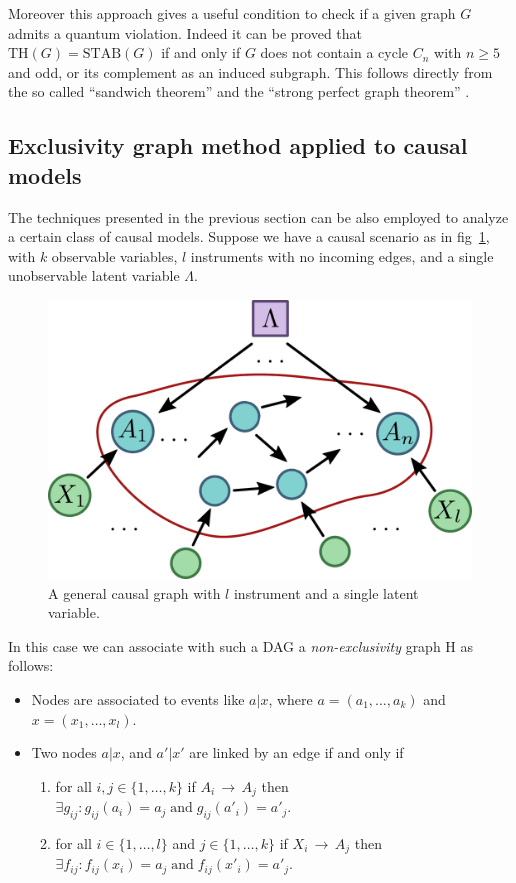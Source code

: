 \documentclass[
    nofootinbin,
    floatfix,
    amsfonts,
    twocolumn, 
    aps, 
    prl]{revtex4-1}
\newcommand{\et}{\;\mathrm{and}\;}
\newcommand{\STAB}{\mathrm{STAB}}
\renewcommand{\TH}{\mathrm{TH}}
\begin{document}
Moreover this approach gives a useful condition to check if a given graph $G$
admits a quantum violation.
Indeed it can be proved that $\TH(G) = \STAB(G)$ if and only if $G$ does not
contain a cycle $C_n$ with $n \ge 5$ and odd, or its complement as an induced subgraph.
This follows directly from the so called ``sandwich theorem'' and the ``strong
perfect graph theorem'' \cite{knuth}.

\subsection{Exclusivity graph method applied to causal models}
The techniques presented in the previous section can be also employed to analyze
a certain class of causal models.
Suppose we have a causal scenario as in fig~\ref{fig:onelambda}, with
$k$ observable variables, $l$ instruments with no incoming edges, and a single
unobservable latent variable $\Lambda$.

\begin{figure}[h]
    \centering
    \includegraphics[width=.9\columnwidth]{images/onelambda.pdf}
    \caption{A general causal graph with $l$ instrument and a single latent
    variable.}
    \label{fig:onelambda}
\end{figure}

In this case we can associate with such a DAG a \emph{non-exclusivity} graph H
as follows:
\begin{itemize}
    \item Nodes are associated to events like $a | x$, where $a = (a_1,\ldots,a_k)$ and  $x = (x_1,\ldots,x_l)$.
    \item Two nodes $a | x$, and $a' | x'$ are linked by an edge if and only if 
        \begin{enumerate}
            \item for all $i,j \in \{1,\ldots,k\}$ if $A_i\,
                \rightarrow\, A_j$ then $\exists g_{ij} : g_{ij}(a_i) = a_j
                \et g_{ij}(a'_i) = a'_j$.
            \item for all $i\in \{1,\ldots,l\}$ and $j\in \{1,\ldots,k\}$ if
                $X_i\,\rightarrow\,A_j$ then $\exists f_{ij} : f_{ij}(x_i) = a_j
                \et f_{ij}(x'_i) = a'_j$.
        \end{enumerate}
\end{itemize}
\end{document}
